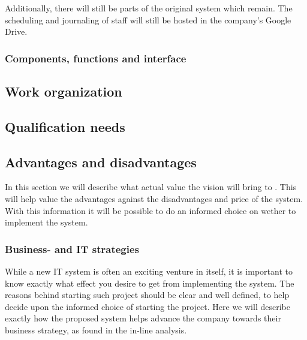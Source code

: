 Additionally, there will still be parts of the original system which remain. 
The scheduling and journaling of staff will still be hosted in the company's 
Google Drive. 

\subsubsection{Components, functions and interface}

\subsection{Work organization}

\subsection{Qualification needs}
	
\subsection{Advantages and disadvantages}
In this section we will describe what actual value the vision will bring to 
\gomonkey. This will help value the advantages against the disadvantages and
price of the system. With this information it will be possible to do an informed
choice on wether to implement the system.

\subsubsection{Business- and IT strategies}
While a new IT system is often an exciting venture in itself, it is important to
know exactly what effect you desire to get from implementing the system. The 
reasons behind starting such project should be clear and well defined, to help
decide upon the informed choice of starting the project. Here we will describe 
exactly how the proposed system helps advance the company towards their 
business strategy, as found in the in-line analysis. 

